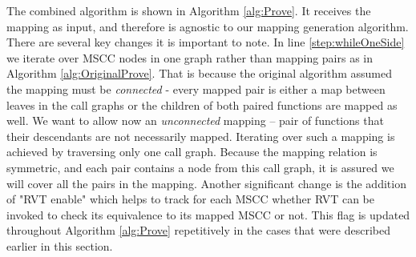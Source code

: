 The combined algorithm is shown in Algorithm \ref{alg:Prove}. It receives the mapping as input, and therefore is agnostic to our mapping generation algorithm. There are several key changes it is important to note. In line \ref{step:whileOneSide} we iterate over MSCC nodes in one graph rather than mapping pairs as in Algorithm \ref{alg:OriginalProve}. That is because the original algorithm assumed the mapping must be \emph{connected} - every mapped pair is either a map between leaves in the call graphs or the children of both paired functions are mapped as well. We want to allow now an \emph{unconnected} mapping – pair of functions that their descendants are not necessarily mapped. Iterating over such a mapping is achieved by traversing only one call graph. Because the mapping relation is symmetric, and each pair contains a node from this call graph, it is assured we will cover all the pairs in the mapping. Another significant change is the addition of "RVT enable" which helps to track for each MSCC whether RVT can be invoked to check its equivalence to its mapped MSCC or not. This flag is updated throughout Algorithm \ref{alg:Prove} repetitively in the cases that were described earlier in this section.  

